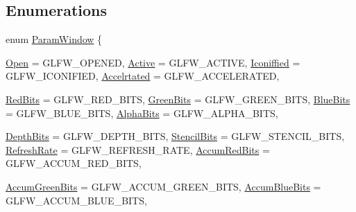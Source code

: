 \subsection*{Enumerations}
\begin{DoxyCompactItemize}
\item 
enum \hyperlink{namespace_f2_c_1_1_window_property_a89ec69d0a86f9d0063dfb69a3ebf3fbe}{ParamWindow} \{ \par
\hyperlink{namespace_f2_c_1_1_window_property_a89ec69d0a86f9d0063dfb69a3ebf3fbeab1ca247d18cc697fe3535df2a8b14658}{Open} =  GLFW\_\-OPENED, 
\hyperlink{namespace_f2_c_1_1_window_property_a89ec69d0a86f9d0063dfb69a3ebf3fbeacca3afb69ba0a8ba1f87768956bb7244}{Active} =  GLFW\_\-ACTIVE, 
\hyperlink{namespace_f2_c_1_1_window_property_a89ec69d0a86f9d0063dfb69a3ebf3fbeaf0eb1dc8907d96e6585829b954c76370}{Iconiffied} =  GLFW\_\-ICONIFIED, 
\hyperlink{namespace_f2_c_1_1_window_property_a89ec69d0a86f9d0063dfb69a3ebf3fbea7edc13366a77ca571f220366df3f2b28}{Accelrtated} =  GLFW\_\-ACCELERATED, 
\par
\hyperlink{namespace_f2_c_1_1_window_property_a89ec69d0a86f9d0063dfb69a3ebf3fbeab8f44786e106553b7050ae8eee99d7f8}{RedBits} =  GLFW\_\-RED\_\-BITS, 
\hyperlink{namespace_f2_c_1_1_window_property_a89ec69d0a86f9d0063dfb69a3ebf3fbea4dee6d7138e48c540f0f4ed0477a77c2}{GreenBits} =  GLFW\_\-GREEN\_\-BITS, 
\hyperlink{namespace_f2_c_1_1_window_property_a89ec69d0a86f9d0063dfb69a3ebf3fbea85338a728924dbd64a07b90b8b22194b}{BlueBits} =  GLFW\_\-BLUE\_\-BITS, 
\hyperlink{namespace_f2_c_1_1_window_property_a89ec69d0a86f9d0063dfb69a3ebf3fbea9b0ed67e79e0fd706e2b4c1117529d45}{AlphaBits} =  GLFW\_\-ALPHA\_\-BITS, 
\par
\hyperlink{namespace_f2_c_1_1_window_property_a89ec69d0a86f9d0063dfb69a3ebf3fbea3cdefeb2737734a971b18515c181c695}{DepthBits} =  GLFW\_\-DEPTH\_\-BITS, 
\hyperlink{namespace_f2_c_1_1_window_property_a89ec69d0a86f9d0063dfb69a3ebf3fbeacb16c1386b942d0928c7176f30363a19}{StencilBits} =  GLFW\_\-STENCIL\_\-BITS, 
\hyperlink{namespace_f2_c_1_1_window_property_a89ec69d0a86f9d0063dfb69a3ebf3fbea3a7c31c849bd8aca0a4b6f0230021400}{RefreshRate} =  GLFW\_\-REFRESH\_\-RATE, 
\hyperlink{namespace_f2_c_1_1_window_property_a89ec69d0a86f9d0063dfb69a3ebf3fbeafa16176fe0f3b5e528dbf1feb3d497ae}{AccumRedBits} =  GLFW\_\-ACCUM\_\-RED\_\-BITS, 
\par
\hyperlink{namespace_f2_c_1_1_window_property_a89ec69d0a86f9d0063dfb69a3ebf3fbea6e19e47f84eee541f96722fa7d0463ed}{AccumGreenBits} =  GLFW\_\-ACCUM\_\-GREEN\_\-BITS, 
\hyperlink{namespace_f2_c_1_1_window_property_a89ec69d0a86f9d0063dfb69a3ebf3fbea97b2ba20eac0c20a059383ce37f80d6b}{AccumBlueBits} =  GLFW\_\-ACCUM\_\-BLUE\_\-BITS, 

\end{DoxyCompactItemize}
